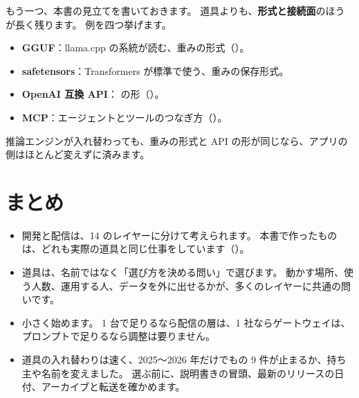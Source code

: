 もう一つ、本書の見立てを書いておきます。
道具よりも、\textbf{形式と接続面}のほうが長く残ります。
例を四つ挙げます。
\begin{itemize}[nosep]
\item \textbf{GGUF}：llama.cpp の系統が読む、重みの形式（）。
\item \textbf{safetensors}：Transformers が標準で使う、重みの保存形式。
\item \textbf{OpenAI 互換 API}： の形（）。
\item \textbf{MCP}：エージェントとツールのつなぎ方（）。
\end{itemize}
推論エンジンが入れ替わっても、重みの形式と API の形が同じなら、アプリの側はほとんど変えずに済みます。

\section{まとめ}\label{sec:tm-summary}

\begin{itemize}
\item 開発と配信は、14 のレイヤーに分けて考えられます。
  本書で作ったものは、どれも実際の道具と同じ仕事をしています（）。
\item 道具は、名前ではなく「選び方を決める問い」で選びます。
  動かす場所、使う人数、運用する人、データを外に出せるかが、多くのレイヤーに共通の問いです。
\item 小さく始めます。
  1 台で足りるなら配信の層は、1 社ならゲートウェイは、プロンプトで足りるなら調整は要りません。
\item 道具の入れ替わりは速く、2025〜2026 年だけでもの 9 件が止まるか、持ち主や名前を変えました。
  選ぶ前に、説明書きの冒頭、最新のリリースの日付、アーカイブと転送を確かめます。
\end{itemize}
